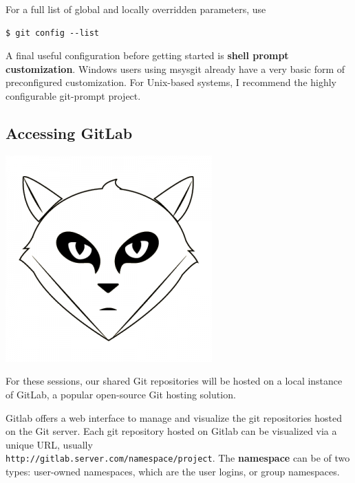 \documentclass{tufte-handout}
\begin{document}
\noindent For a full list of global and locally overridden parameters, use

\begin{lstlisting}[style=BashInputStyle]
  $ git config --list
\end{lstlisting}

A final useful configuration before getting started is \textbf{shell prompt customization}.
Windows users using msysgit already have a very basic form of preconfigured customization. 
For Unix-based systems, I recommend the highly configurable git-prompt project. 


\subsection{Accessing GitLab}

\begin{marginfigure}%
  \centering
  \includegraphics[width=0.6\linewidth]{gitlab-logo.png}
  \label{fig:gitlablogo}
\end{marginfigure}
For these sessions, our shared Git repositories will be hosted on a local instance of GitLab, a popular open-source Git hosting solution.

Gitlab offers a web interface to manage and visualize the git repositories hosted on the Git server.
Each git repository hosted on Gitlab can be visualized via a unique URL, usually \\ \noindent \texttt{http://gitlab.server.com/namespace/project}.
The \textbf{namespace} can be of two types: user-owned namespaces, which are the user logins, or group namespaces.
\end{document}
